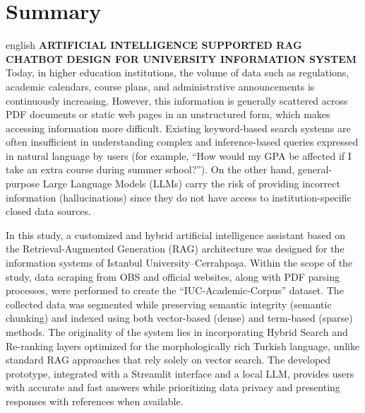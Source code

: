 \documentclass[12pt,a4paper]{report}
\begin{document}
\chapter*{Summary}
\begin{otherlanguage*}{english}
\textbf{ARTIFICIAL INTELLIGENCE SUPPORTED RAG CHATBOT DESIGN FOR UNIVERSITY INFORMATION SYSTEM}\\[0.5cm]

Today, in higher education institutions, the volume of data such as regulations, academic calendars, course plans, and administrative announcements is continuously increasing. However, this information is generally scattered across PDF documents or static web pages in an unstructured form, which makes accessing information more difficult. Existing keyword-based search systems are often insufficient in understanding complex and inference-based queries expressed in natural language by users (for example, “How would my GPA be affected if I take an extra course during summer school?”). On the other hand, general-purpose Large Language Models (LLMs) carry the risk of providing incorrect information (hallucinations) since they do not have access to institution-specific closed data sources.

In this study, a customized and hybrid artificial intelligence assistant based on the Retrieval-Augmented Generation (RAG) architecture was designed for the information systems of Istanbul University–Cerrahpaşa. Within the scope of the study, data scraping from OBS and official websites, along with PDF parsing processes, were performed to create the “IUC-Academic-Corpus” dataset. The collected data was segmented while preserving semantic integrity (semantic chunking) and indexed using both vector-based (dense) and term-based (sparse) methods. The originality of the system lies in incorporating Hybrid Search and Re-ranking layers optimized for the morphologically rich Turkish language, unlike standard RAG approaches that rely solely on vector search. The developed prototype, integrated with a Streamlit interface and a local LLM, provides users with accurate and fast answers while prioritizing data privacy and presenting responses with references when available.
\end{otherlanguage*}

\cleardoublepage
{}

\end{document}
